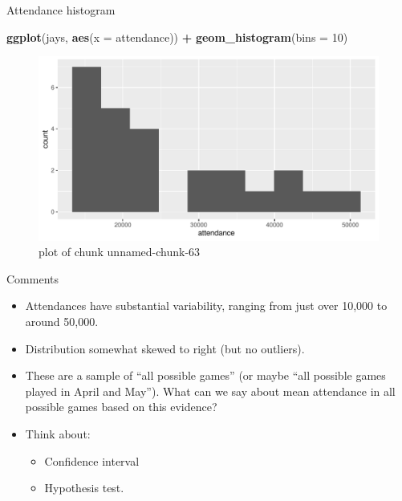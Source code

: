 \documentclass[
  ignorenonframetext,
]{beamer}
\newenvironment{Shaded}{\begin{snugshade}}{\end{snugshade}}
\newcommand{\DataTypeTok}[1]{\textcolor[rgb]{0.13,0.29,0.53}{#1}}
\newcommand{\DecValTok}[1]{\textcolor[rgb]{0.00,0.00,0.81}{#1}}
\newcommand{\KeywordTok}[1]{\textcolor[rgb]{0.13,0.29,0.53}{\textbf{#1}}}
\newcommand{\NormalTok}[1]{#1}
\newcommand{\OperatorTok}[1]{\textcolor[rgb]{0.81,0.36,0.00}{\textbf{#1}}}
\newcommand{\StringTok}[1]{\textcolor[rgb]{0.31,0.60,0.02}{#1}}
\providecommand{\tightlist}{%
  \setlength{\itemsep}{0pt}\setlength{\parskip}{0pt}}
\begin{document}
\begin{frame}[fragile]{Attendance histogram}
\protect\hypertarget{attendance-histogram}{}

\begin{Shaded}
\begin{Highlighting}[]
\KeywordTok{ggplot}\NormalTok{(jays, }\KeywordTok{aes}\NormalTok{(}\DataTypeTok{x =}\NormalTok{ attendance)) }\OperatorTok{+}\StringTok{ }\KeywordTok{geom_histogram}\NormalTok{(}\DataTypeTok{bins =} \DecValTok{10}\NormalTok{)}
\end{Highlighting}
\end{Shaded}

\begin{figure}
\centering
\includegraphics{figure/unnamed-chunk-63-1.pdf}
\caption{plot of chunk unnamed-chunk-63}
\end{figure}

\end{frame}

\begin{frame}{Comments}
\protect\hypertarget{comments}{}

\begin{itemize}
\tightlist
\item
  Attendances have substantial variability, ranging from just over
  10,000 to around 50,000.
\item
  Distribution somewhat skewed to right (but no outliers).
\item
  These are a sample of ``all possible games'' (or maybe ``all possible
  games played in April and May''). What can we say about mean
  attendance in all possible games based on this evidence?
\item
  Think about:

  \begin{itemize}
  \tightlist
  \item
    Confidence interval
  \item
    Hypothesis test.
  \end{itemize}
\end{itemize}

\end{frame}
\end{document}
